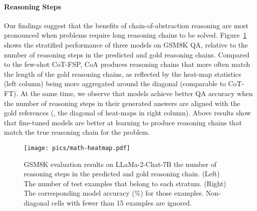 \paragraph{Reasoning Steps}
Our findings suggest that the benefits of chain-of-abstraction reasoning are most pronounced when problems require long reasoning chains to be solved. Figure~\ref{math_heatmap} shows the stratified performance of three models on GSM8K QA, relative to the number of reasoning steps in the predicted and gold reasoning chains. 
Compared to the few-shot CoT-FSP, CoA produces reasoning chains that more often match the length of the gold reasoning chains, as reflected by the heat-map statistics (left column) being more aggregated around the diagonal (comparable to CoT-FT).
At the same time, we observe that models achieve better QA accuracy when the number of reasoning steps in their generated answers are aligned with the gold references (\ie{}, the diagonal of heat-maps in right column).
Above results show that fine-tuned models are better at learning to produce reasoning chains that match the true reasoning chain for the problem.

\begin{figure}[t]
\centering
\texttt{[image: pics/math-heatmap.pdf]}
\caption{GSM8K evaluation results on LLaMa-2-Chat-7B \wrt{} the number of reasoning steps in the predicted and gold reasoning chain. (Left) The number of test examples that belong to each stratum. (Right) The corresponding model accuracy (\%) for those examples. Non-diagonal cells with fewer than 15 examples are ignored.}
\label{math_heatmap}
\end{figure}

\begin{table}[t]
\centering
{}
\caption{Human evaluation results of arithmetic and reasoning error rates on 200 GSM8K test samples. Models developed based on LLaMa-2-Chat-7B are presented.}
\label{tab:human_eval}
\end{table}

